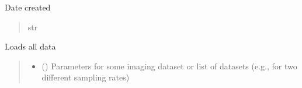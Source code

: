 \documentclass[letterpaper,10pt,english]{sphinxmanual}
\begin{document}
\begin{fulllineitems}
\begin{fulllineitems}
\begin{quote}
\begin{description}
\end{description}\end{quote}

\end{fulllineitems}


\begin{fulllineitems}
\label{\detokenize{Organization:Organization.Experiment.instance_date}}
\pysigstartsignatures
{}
\pysigstopsignatures
\sphinxAtStartPar
Date created
\begin{quote}\begin{description}
\sphinxAtStartPar
str

\end{description}\end{quote}

\end{fulllineitems}


\begin{fulllineitems}
\label{\detokenize{Organization:Organization.Experiment.load_data}}
\pysigstartsignatures
{}
\pysigstopsignatures
\sphinxAtStartPar
Loads all data
\begin{quote}\begin{description}
\begin{itemize}
\item {} 
\sphinxAtStartPar
{} (\sphinxstyleliteralemphasis{\sphinxupquote{{[}}}\sphinxstyleliteralemphasis{\sphinxupquote{{]}}}) \textendash{} Parameters for some imaging dataset or list of datasets (e.g., for two different sampling rates)


\end{itemize}
\end{description}
\end{quote}
\end{fulllineitems}
\end{fulllineitems}
\end{document}
